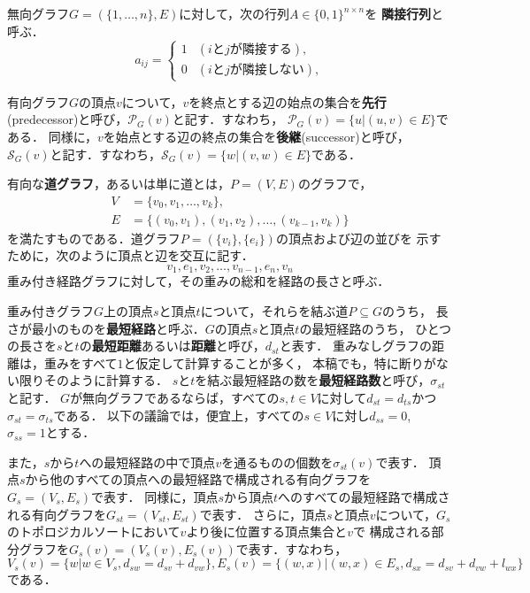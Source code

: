 無向グラフ$G=(\{1,\ldots,n\},E)$に対して，次の行列$A\in\{0,1\}^{n\times n}$を
\textbf{隣接行列}と呼ぶ．
\begin{equation*}
  a_{ij}=
  \begin{cases}
    1 & (i\text{と}j\text{が隣接する}), \\
    0 & (i\text{と}j\text{が隣接しない}),
  \end{cases}
\end{equation*}

有向グラフ$G$の頂点$v$について，$v$を終点とする辺の始点の集合を\textbf{先行}
(predecessor)と呼び，$\mathcal{P}_G(v)$と記す．すなわち，
$\mathcal{P}_G(v)=\{u|(u,v)\in E\}$である．
同様に，$v$を始点とする辺の終点の集合を\textbf{後継}(successor)と呼び，
$\mathcal{S}_G(v)$と記す．すなわち，$\mathcal{S}_G(v)=\{w|(v,w)\in E\}$である．

有向な\textbf{道グラフ}，あるいは単に道とは，$P=(V,E)$のグラフで，
\begin{equation*}
  \begin{aligned}
  V&=\{v_0,v_1,\ldots,v_k\}, \\
  E&=\{(v_0,v_1),(v_1,v_2),\ldots,(v_{k-1},v_k)\}
  \end{aligned}
\end{equation*}
を満たすものである．道グラフ$P=(\{v_i\},\{e_i\})$の頂点および辺の並びを
示すために，次のように頂点と辺を交互に記す．
\[ v_1,e_1,v_2,\ldots,v_{n-1},e_n,v_n \]
重み付き経路グラフに対して，その重みの総和を経路の長さと呼ぶ．

重み付きグラフ$G$上の頂点$s$と頂点$t$について，それらを結ぶ道$P\subseteq G$のうち，
長さが最小のものを\textbf{最短経路}と呼ぶ．$G$の頂点$s$と頂点$t$の最短経路のうち，
ひとつの長さを$s$と$t$の\textbf{最短距離}あるいは\textbf{距離}と呼び，$d_{st}$と表す．
重みなしグラフの距離は，重みをすべて$1$と仮定して計算することが多く，
本稿でも，特に断りがない限りそのように計算する．
$s$と$t$を結ぶ最短経路の数を\textbf{最短経路数}と呼び，$\sigma_{st}$と記す．
$G$が無向グラフであるならば，すべての$s,t\in V$に対して$d_{st}=d_{ts}$かつ
$\sigma_{st}=\sigma_{ts}$である．
以下の議論では，便宜上，すべての$s\in V$に対し$d_{ss}=0$, $\sigma_{ss}=1$とする．

また，$s$から$t$への最短経路の中で頂点$v$を通るものの個数を$\sigma_{st}(v)$で表す．
頂点$s$から他のすべての頂点への最短経路で構成される有向グラフを$G_s=(V_s,E_s)$で表す．
同様に，頂点$s$から頂点$t$へのすべての最短経路で構成される有向グラフを$G_{st}=(V_{st},E_{st})$で表す．
さらに，頂点$s$と頂点$v$について，$G_s$のトポロジカルソートにおいて$v$より後に位置する頂点集合と$v$で
構成される部分グラフを$G_s(v)=(V_s(v),E_s(v))$で表す．すなわち，
$V_s(v)=\{w|w\in V_s,d_{sw}=d_{sv}+d_{vw}\}, E_s(v)=\{(w,x)|(w,x)\in E_s,d_{sx}=d_{sv}+d_{vw}+l_{wx}\}$
である．

